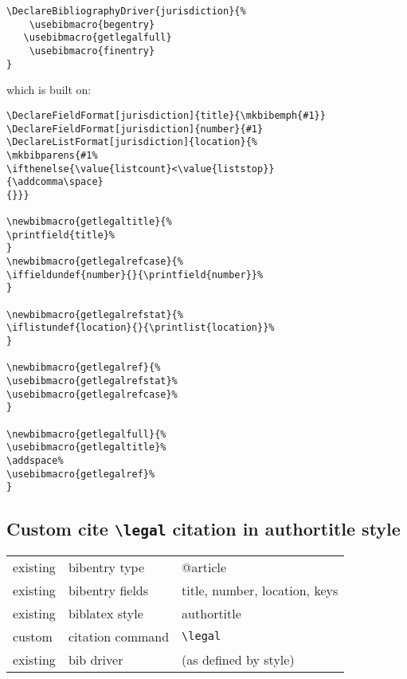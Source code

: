 \documentclass[12pt]{article}
\newcommand\notsogoodoh{{\large\ftmark 🗶}}
\newcommand\cmd[1]{\texttt{\textbackslash #1}}
\begin{document}
\begin{verbatim}
\DeclareBibliographyDriver{jurisdiction}{%
	\usebibmacro{begentry}
   \usebibmacro{getlegalfull}
	\usebibmacro{finentry}
}
\end{verbatim}

which is built on:

\begin{verbatim}
\DeclareFieldFormat[jurisdiction]{title}{\mkbibemph{#1}}
\DeclareFieldFormat[jurisdiction]{number}{#1}
\DeclareListFormat[jurisdiction]{location}{%
\mkbibparens{#1%
\ifthenelse{\value{listcount}<\value{liststop}}
{\addcomma\space}
{}}}

\newbibmacro{getlegaltitle}{%
\printfield{title}%
}
\newbibmacro{getlegalrefcase}{%
\iffieldundef{number}{}{\printfield{number}}%
}

\newbibmacro{getlegalrefstat}{%
\iflistundef{location}{}{\printlist{location}}%
}

\newbibmacro{getlegalref}{%
\usebibmacro{getlegalrefstat}%
\usebibmacro{getlegalrefcase}%
}

\newbibmacro{getlegalfull}{%
\usebibmacro{getlegaltitle}%
\addspace%
\usebibmacro{getlegalref}%
}
\end{verbatim}




\subsection{Custom cite \cmd{legal} citation in authortitle style}


\begin{tabular}{lll}
existing   &    bibentry type               & \ttfamily @article \\
existing   &    bibentry fields              & \ttfamily title, number, location, keys \\
existing   &    biblatex style                & \ttfamily authortitle \\
custom    &    citation command           & \cmd{legal} \\
existing   &    bib driver                    & (as defined by style) \\
\end{tabular}
\bigskip
\end{document}
